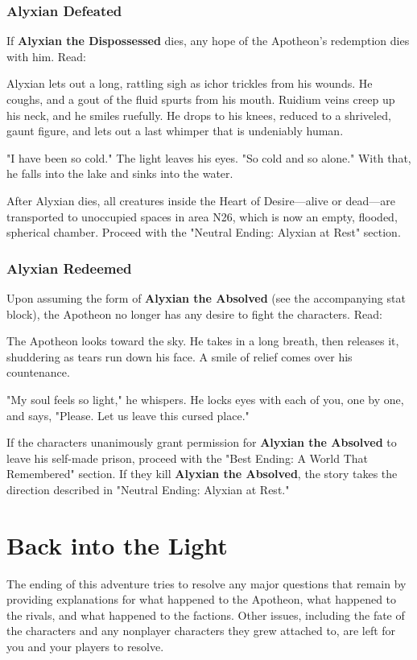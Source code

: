 \documentclass[10pt,a4paper,twoside,bg=print,twocolumn,openany,nodeprecatedcode]{dndbook}
\begin{document}
\subsubsection{Alyxian Defeated}
If \textbf{Alyxian the Dispossessed} dies, any hope of the Apotheon's redemption dies with him. Read:

\begin{DndReadAloud}{}
Alyxian lets out a long, rattling sigh as ichor trickles from his wounds. He coughs, and a gout of the fluid spurts from his mouth. Ruidium veins creep up his neck, and he smiles ruefully. He drops to his knees, reduced to a shriveled, gaunt figure, and lets out a last whimper that is undeniably human.

"I have been so cold." The light leaves his eyes. "So cold and so alone." With that, he falls into the lake and sinks into the water.

\end{DndReadAloud}

After Alyxian dies, all creatures inside the Heart of Desire—alive or dead—are transported to unoccupied spaces in area N26, which is now an empty, flooded, spherical chamber. Proceed with the "Neutral Ending: Alyxian at Rest" section.

\subsubsection{Alyxian Redeemed}
Upon assuming the form of \textbf{Alyxian the Absolved} (see the accompanying stat block), the Apotheon no longer has any desire to fight the characters. Read:

\begin{DndReadAloud}{}
The Apotheon looks toward the sky. He takes in a long breath, then releases it, shuddering as tears run down his face. A smile of relief comes over his countenance.

"My soul feels so light," he whispers. He locks eyes with each of you, one by one, and says, "Please. Let us leave this cursed place."

\end{DndReadAloud}

If the characters unanimously grant permission for \textbf{Alyxian the Absolved} to leave his self-made prison, proceed with the "Best Ending: A World That Remembered" section. If they kill \textbf{Alyxian the Absolved}, the story takes the direction described in "Neutral Ending: Alyxian at Rest."

\section{Back into the Light}
The ending of this adventure tries to resolve any major questions that remain by providing explanations for what happened to the Apotheon, what happened to the rivals, and what happened to the factions. Other issues, including the fate of the characters and any nonplayer characters they grew attached to, are left for you and your players to resolve.
\end{document}
